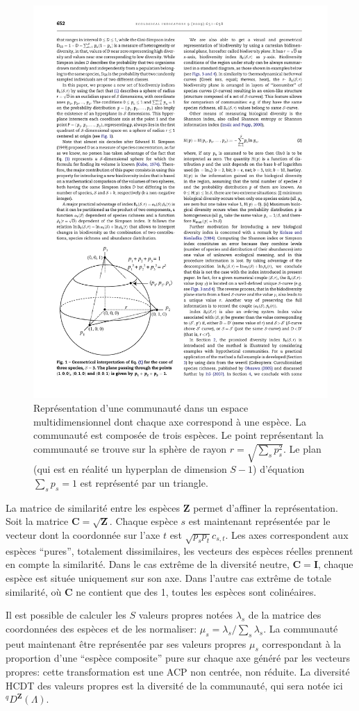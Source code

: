 \documentclass[
  11pt,
  french,
  a4paper,
  extrafontsizes,onecolumn,openright
  ]{memoir}
\begin{document}
\begin{figure}

{\centering \includegraphics[width=0.5\linewidth]{images/Campos2009} 

}

\caption{Représentation d'une communauté dans un espace multidimensionnel dont chaque axe correspond à une espèce. La communauté est composée de trois espèces. Le point représentant la communauté se trouve sur la sphère de rayon \(r=\sqrt{\sum_s{p_s^2}}\). Le plan (qui est en réalité un hyperplan de dimension \(S-1\)) d'équation \(\sum_s{p_s}=1\) est représenté par un triangle.}\label{fig:Campos2009}
\end{figure}

\normalsize

La matrice de similarité entre les espèces \(\mathbf{Z}\) permet d'affiner la représentation.
Soit la matrice \(\mathbf{C}=\sqrt{\mathbf{Z}}\).
Chaque espèce \(s\) est maintenant représentée par le vecteur dont la coordonnée sur l'axe \(t\) est \(\sqrt{p_s p_t}c_{s,t}\).
Les axes correspondent aux espèces ``pures'', totalement dissimilaires, les vecteurs des espèces réelles prennent en compte la similarité.
Dans le cas extrême de la diversité neutre, \(\mathbf{C}=\mathbf{I}\), chaque espèce est située uniquement sur son axe.
Dans l'autre cas extrême de totale similarité, où \(\mathbf{C}\) ne contient que des 1, toutes les espèces sont colinéaires.

Il est possible de calculer les \(S\) valeurs propres notées \(\lambda_s\) de la matrice des coordonnées des espèces et de les normaliser: \(\mu_s={\lambda_s}/{\sum_s{\lambda_s}}\).
La communauté peut maintenant être représentée par ses valeurs propres \(\mu_s\) correspondant à la proportion d'une ``espèce composite'' pure sur chaque axe généré par les vecteurs propres: cette transformation est une ACP non centrée, non réduite.
La diversité HCDT des valeurs propres est la diversité de la communauté, qui sera notée ici \(^q\!D^{\mathbf{Z}}(\Lambda)\).
\end{document}
